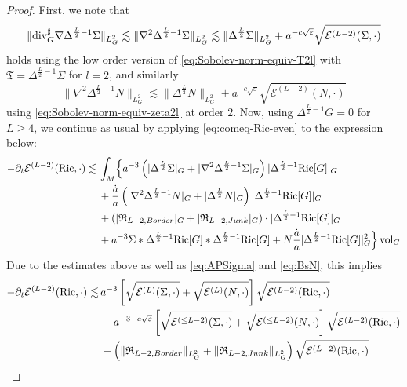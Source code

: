 \documentclass[11pt,leqno,textwidth=10cm]{amsart}
\numberwithin{equation}{section}
\theoremstyle{definition}
\theoremstyle{plain}
\newcommand{\1}{\mathbbm{1}}
\newcommand{\E}{\mathcal{E}}
\newcommand{\Ric}{\text{\normalfont{Ric}}}
\newcommand{\vol}[1]{{\text{\normalfont{vol}}}_{#1}}
\renewcommand{\epsilon}{\varepsilon}
\newcommand{\del}{\partial}
\newcommand{\Lap}{\Delta}
\renewcommand{\div}{\text{\normalfont{div}}}
\begin{document}
\begin{proof}
First, we note that
\[\|\div_G^\sharp\nabla\Lap^{\frac{L}2-1}\Sigma\|_{L^2_G}\lesssim \|\nabla^2\Lap^{\frac{L}2-1}\Sigma\|_{L^2_G}\lesssim \|\Lap^{\frac{L}2}\Sigma\|_{L^2_G}+a^{-c\sqrt{\epsilon}}\sqrt{\E^{(L-2)}(\Sigma,\cdot)}\]
holds using the low order version of \eqref{eq:Sobolev-norm-equiv-T2l} with $\mathfrak{T}=\Lap^{\frac{L}2-1}\Sigma$ for $l=2$, and similarly
\[\|\nabla^2\Lap^{\frac{L}2-1}N\|_{L^2_G}\lesssim \|\Lap^{\frac{L}2}N\|_{L^2_G}+a^{-c\sqrt{\epsilon}}\sqrt{\E^{(L-2)}(N,\cdot)}\]
using \eqref{eq:Sobolev-norm-equiv-zeta2l} at order $2$. Now, using $\Lap^{\frac{L}2-1} G=0$ for $L\geq 4$, we continue as usual by applying \eqref{eq:comeq-Ric-even} to the expression below:
\begin{align*}
-\del_t\E^{(L-2)}(\Ric,\cdot)%
\lesssim&\,\int_M \Bigr\{a^{-3}\left(\lvert\Lap^{\frac{L}2}\Sigma\rvert_G+\lvert\nabla^2\Lap^{\frac{L}2-1}\Sigma\rvert_G\right)\lvert\Lap^{\frac{L}2-1}\Ric[G]\rvert_G\\
&\,+\frac{\dot{a}}a\left(\lvert\nabla^2\Lap^{\frac{L}2-1}N\rvert_G+\lvert\Lap^{\frac{L}2}N\rvert_G\right)\lvert\Lap^{\frac{L}2-1}\Ric[G]\rvert_G\\
&\,+\left(\lvert\mathfrak{R}_{L-2,Border}\rvert_G+\lvert\mathfrak{R}_{L-2,Junk}\rvert_G\right)\cdot\lvert\Lap^{\frac{L}2-1}\Ric[G]\rvert_G\\
&\,+a^{-3}\Sigma\ast\Lap^{\frac{L}2-1}\Ric[G]\ast\Lap^{\frac{L}2-1}\Ric[G]+N\frac{\dot{a}}a\lvert\Lap^{\frac{L}2-1}\Ric[G]\rvert_G^2\Bigr\}\,\vol{G}
\end{align*}
Due to the estimates above as well as \eqref{eq:APSigma} and \eqref{eq:BsN}, this implies
\begin{align*}
-\del_t\E^{(L-2)}(\Ric,\cdot)\lesssim&\,a^{-3}\left[\sqrt{\E^{(L)}(\Sigma,\cdot)}+\sqrt{\E^{(L)}(N,\cdot)}\right]\sqrt{\E^{(L-2)}(\Ric,\cdot)}\\
&\,+a^{-3-c\sqrt{\epsilon}}\left[\sqrt{\E^{(\leq L-2)}(\Sigma,\cdot)}+\sqrt{\E^{(\leq L-2)}(N,\cdot)}\right]\sqrt{\E^{(L-2)}(\Ric,\cdot)}\\
&\,+\left(\|\mathfrak{R}_{L-2,Border}\|_{L^2_G}+\|\mathfrak{R}_{L-2,Junk}\|_{L^2_G}\right)\sqrt{\E^{(L-2)}(\Ric,\cdot)}\\

\end{align*}
\end{proof}
\end{document}
